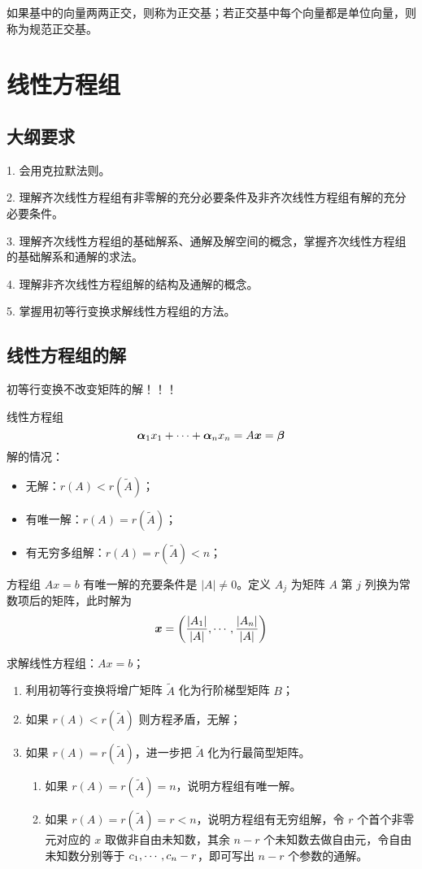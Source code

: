 如果基中的向量两两正交，则称为正交基；若正交基中每个向量都是单位向量，则称为规范正交基。

\section{线性方程组}

\subsection{大纲要求}

1. 会用克拉默法则。

2. 理解齐次线性方程组有非零解的充分必要条件及非齐次线性方程组有解的充分必要条件。

3. 理解齐次线性方程组的基础解系、通解及解空间的概念，掌握齐次线性方程组的基础解系和通解的求法。

4. 理解非齐次线性方程组解的结构及通解的概念。

5. 掌握用初等行变换求解线性方程组的方法。

\subsection{线性方程组的解}

初等行变换不改变矩阵的解！！！

线性方程组
\[ \boldsymbol{\alpha}_1x_1 + \cdots + \boldsymbol{\alpha}_nx_n = A \boldsymbol{x} = \boldsymbol{\beta} \]
解的情况：
\begin{itemize}
	\item 无解：$r(A) < r(\widetilde{A})$；
	\item 有唯一解：$r(A) = r(\widetilde{A})$；
	\item 有无穷多组解：$r(A) = r(\widetilde{A}) < n$；
\end{itemize}


\begin{theorem}[Cramer 法则]
	方程组 $Ax = b$ 有唯一解的充要条件是 $|A| \neq 0$。定义 $A_j$ 为矩阵 $A$ 第 $j$ 列换为常数项后的矩阵，此时解为
	\[ \boldsymbol{x} = \left( \frac{|A_1|}{|A|}, \cdots, \frac{|A_n|}{|A|} \right) \]
\end{theorem}

求解线性方程组：$Ax = b$；
\begin{enumerate}
	\item 利用初等行变换将增广矩阵 $\widetilde{A}$ 化为行阶梯型矩阵 $B$；
	\item 如果 $r(A) < r(\widetilde{A})$ 则方程矛盾，无解；
	\item 如果 $r(A) = r(\widetilde{A})$，进一步把 $\widetilde{A}$ 化为行最简型矩阵。
	      \begin{enumerate}
		      \item 如果 $r(A) = r(\widetilde{A}) = n$，说明方程组有唯一解。
		      \item 如果 $r(A) = r(\widetilde{A}) = r < n$，说明方程组有无穷组解，令 $r$ 个首个非零元对应的 $x$ 取做非自由未知数，其余 $n-r$ 个未知数去做自由元，令自由未知数分别等于 $c_1,\cdots,c_n-r$，即可写出 $n-r$ 个参数的通解。
	      \end{enumerate}
\end{enumerate}

